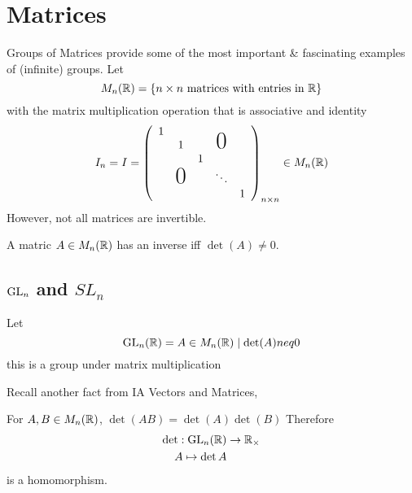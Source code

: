 \documentclass{article}
\begin{document}
\section{Matrices}

Groups of Matrices provide some of the most important \& fascinating examples of (infinite) groups.
Let
\[
    M_n(\mathbb{R}) = \{ n \times n \text{ matrices with entries in } \mathbb{R}\}
\]
with the matrix multiplication operation that is associative and identity
\[
    I_n = I = \bkt{
        \begin{array}{ccccc}
            1                                                    \\
              & 1                     &  & \smash{\text{\huge0}} \\
              &                       & 1                        \\
              & \smash{\text{\huge0}} &   & \ddots               \\
              &                       &   &   & 1
        \end{array}
    }_{n \times n} \in M_n(\R)
\]
However, not all matrices are invertible.
\begin{lemma}
    A matric $A \in M_n(\mathbb{R})$ has an inverse iff $\det(A) \neq 0$.
\end{lemma}
\subsection{$\mathrm{GL}_n$ and $SL_n$}
\begin{defi}
    Let
    \[
        \mathrm{GL}_n(\mathbb{R}) = {A \in M_n(\mathbb{R}) \mid \det(A) neq 0}  
    \]
    this is a group under matrix multiplication
\end{defi}

Recall another fact from IA Vectors and Matrices, 
\begin{lemma}
    For $A, B \in M_n(\mathbb{R})$, $\det(AB) = \det(A)\det(B)$
    Therefore
    \begin{align*}
        \det: \mathrm{GL}_n(\mathbb{R}) &\rightarrow \mathbb{R}_\times \\
        A \mapsto \det A
    \end{align*}
    is a homomorphism.
\end{lemma}
\end{document}
